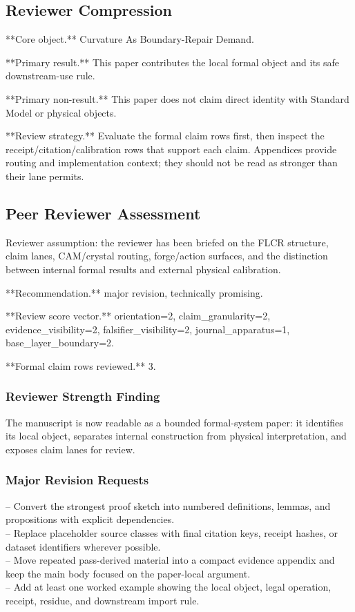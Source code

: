 \documentclass[11pt]{article}
\begin{document}
\subsection*{Reviewer Compression}

**Core object.** Curvature As Boundary-Repair Demand.

**Primary result.** This paper contributes the local formal object and its safe downstream-use rule.

**Primary non-result.** This paper does not claim direct identity with Standard Model or physical objects.

**Review strategy.** Evaluate the formal claim rows first, then inspect the receipt/citation/calibration rows that support each claim. Appendices provide routing and implementation context; they should not be read as stronger than their lane permits.

\subsection*{Peer Reviewer Assessment}

Reviewer assumption: the reviewer has been briefed on the FLCR structure, claim lanes, CAM/crystal routing, forge/action surfaces, and the distinction between internal formal results and external physical calibration.

**Recommendation.** major revision, technically promising.

**Review score vector.** orientation=2, claim\_granularity=2, evidence\_visibility=2, falsifier\_visibility=2, journal\_apparatus=1, base\_layer\_boundary=2.

**Formal claim rows reviewed.** 3.

\subsubsection*{Reviewer Strength Finding}

The manuscript is now readable as a bounded formal-system paper: it identifies its local object, separates internal construction from physical interpretation, and exposes claim lanes for review.

\subsubsection*{Major Revision Requests}

\noindent{}-- Convert the strongest proof sketch into numbered definitions, lemmas, and propositions with explicit dependencies.\\
\noindent{}-- Replace placeholder source classes with final citation keys, receipt hashes, or dataset identifiers wherever possible.\\
\noindent{}-- Move repeated pass-derived material into a compact evidence appendix and keep the main body focused on the paper-local argument.\\
\noindent{}-- Add at least one worked example showing the local object, legal operation, receipt, residue, and downstream import rule.\\
\end{document}
